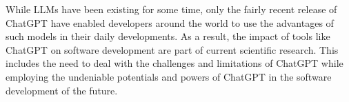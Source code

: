 While \acp{LLM} have been existing for some time, only the fairly recent release of ChatGPT have enabled developers around the world to use the advantages of such models in their daily developments. As a result, the impact of tools like ChatGPT on software development are part of current scientific research. This includes the need to deal with the challenges and limitations of ChatGPT while employing the undeniable potentials and powers of ChatGPT in the software development of the future. 
\begin{comment}
Ziel dieser Bachelorarbeit war es, ein Tool zu Bewertung der Dokumentation zu entwickeln, das in einem \ac{CI/CD}-Prozess eingebunden werden kann und nicht auf einer Programmiersprache beschränkt ist. Dabei beschränkt sich diese Bachelorarbeit auf strukturierte Kommentaren wie z.~B. Javadoc. Dieses Ziel wurde im Großen und Ganzen erreicht.

Durch die allgemein gehaltene Klassenstruktur für das Parsing ist es möglich, Quellcode in anderen Programmiersprachen bewerten zu lassen. Allerdings muss dafür ein entsprechender Parser geschrieben werden, welcher den Quellcode in die vorgegebene Struktur transformiert. Dabei ist es natürlich nicht möglich, jedes Detail abzubilden, sondern es müssen Abstriche gemacht werden. Nichtsdestotrotz können auch sprachspezifische Eigenheiten berücksichtigt werden, indem eine entsprechende abgeleitete Klasse von \textit{ComponentMetaInformation} gebildet wird und diese sprachspezifischen Informationen dort gespeichert werden. Diese Daten können von einem geeigneten \textit{LanguageSpecificHelper} dazu verwendet werden, um sprachabhängige Details bei der Bewertung der Dokumentation zu berücksichtigen. 

Auch das Parsen der strukturierten Kommentare erfolgt recht abstrakt, indem  die Informationen in den Beschreibungstexten unstrukturiert als Zeichenketten gespeichert werden, sodass die einzelnen Metriken diese Informationen weiterverarbeiten müssen. Da es Metriken gibt, die mit den einzelnen Wörtern ein eines Kommentars arbeiten und auch Metriken, welche die interne Struktur des Kommentars analysieren, wäre es ein mögliches Forschungsthema, wie diese zwei Darstellungen besser repräsentiert werden können. 

Um das Tool konfigurierbar zu halten, wurde ein Konzept für eine Konfigurationsdatei im \ac{JSON}-Format vorgestellt, das alle wichtigen Informationen enthält. Die Konfiguration kann auch über GitHub Actions durchgeführt werden, indem passende Umgebungsvariablen gesetzt werden.  So kann das Tool sowohl als reguläres Programm auf einem lokalen System verwendet werden als auch mittels GitHub Actions in den \ac{CI/CD}-Prozess eingebunden werden. Durch die flexible Konfiguration kann ein Nutzer frei entscheiden, welche Metriken er für sinnvoll hält und wie er sie gewichten will. Dabei überschreibt die Konfiguration mittels GitHub Actions stets die Konfiguration in der \ac{JSON}-Datei. Außerdem können die Metriken selbst begrenzt konfiguriert werden. Eine Nutzung des Tools auf anderen \ac{CI/CD}-Plattformen, die mit GitHub Actions vergleichbar sind,  ist prinzipiell ebenfalls möglich, da die Konfiguration von dem  übrigen Programm entkoppelt ist.


\end{comment}
